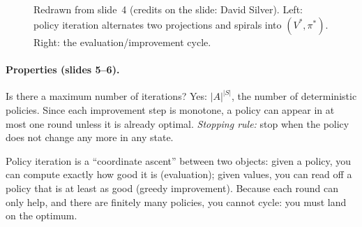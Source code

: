 \documentclass[11pt,a4paper]{article}
\theoremstyle{plain}
\theoremstyle{definition}
\theoremstyle{remark}
\begin{document}
\begin{figure}[H]
\centering
{}
\caption{Redrawn from slide~4 (credits on the slide: David Silver). Left: policy iteration alternates two projections and spirals into $(V^*,\pi^*)$. Right: the evaluation/improvement cycle.}
\end{figure}

\paragraph{Properties (slides 5--6).} Is there a maximum number of iterations? Yes: $|A|^{|S|}$, the number of deterministic policies. Since each improvement step is monotone, a policy can appear in at most one round unless it is already optimal. \emph{Stopping rule:} stop when the policy does not change any more in any state.

\begin{intuition}
Policy iteration is a ``coordinate ascent'' between two objects: given a policy, you can compute exactly how good it is (evaluation); given values, you can read off a policy that is at least as good (greedy improvement). Because each round can only help, and there are finitely many policies, you cannot cycle: you must land on the optimum.
\end{intuition}
\end{document}
